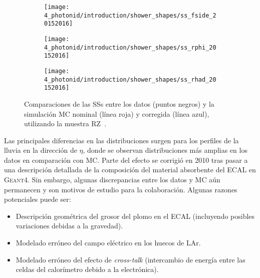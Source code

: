 \begin{figure}[ht!]
    \centering
    \begin{subfigure}[h]{0.32\linewidth}
        \centering
        \texttt{[image: 4\_photonid/introduction/shower\_shapes/ss\_fside\_20152016]}
        \caption{\fside}
        \label{fig:pid_ss:ss_differences:ss:fside}
    \end{subfigure}
    \hfill
    \begin{subfigure}[h]{0.32\linewidth}
        \centering
        \texttt{[image: 4\_photonid/introduction/shower\_shapes/ss\_rphi\_20152016]}
        \caption{\rphi}
        \label{fig:pid_ss:ss_differences:ss:rphi}
    \end{subfigure}
    \hfill
    \begin{subfigure}[h]{0.32\linewidth}
        \centering
        \texttt{[image: 4\_photonid/introduction/shower\_shapes/ss\_rhad\_20152016]}
        \caption{\rhad}
        \label{fig:pid_ss:ss_differences:ss:rhad}
    \end{subfigure}
    \caption{Comparaciones de las \acp{SS} entre los datos (puntos negros) y la simulación \ac{MC} nominal (línea roja) y corregida (línea azul), utilizando la muestra \ac{RZ}~\cite{ATLAS-EGamma-Calibration-2015-2016}.}
    \label{fig:pid_ss:ss_differences:ss}
\end{figure}

Las principales diferencias en las distribuciones surgen para los perfiles de la lluvia en la direcci\'on de \(\eta\), donde se observan distribuciones más amplias en los datos en comparación con \ac{MC}. Parte del efecto se corrigió en 2010 tras pasar a una descripción detallada de la composición del material absorbente del \ac{ECAL} en \textsc{Geant4}. Sin embargo, algunas discrepancias entre los datos y \ac{MC} aún permanecen y son motivos de estudio para la colaboraci\'on. Algunas razones potenciales puede ser:
\begin{itemize}
    \item Descripción geom\'etrica del grosor del plomo en el \ac{ECAL} (incluyendo posibles variaciones debidas a la gravedad).
    \item Modelado erróneo del campo eléctrico en los huecos de \ac{LAr}.
    \item Modelado erróneo del efecto de \textit{cross-talk} (intercambio de energía entre las celdas del calorímetro debido a la electrónica).
\end{itemize}


